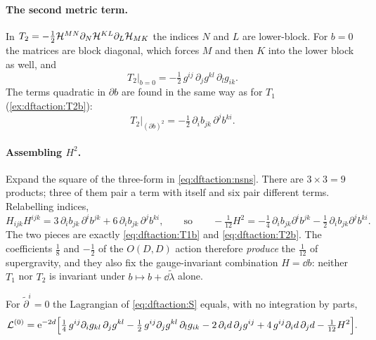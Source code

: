 \paragraph{The second metric term.} In $T_2=-\tfrac12\mathcal{H}^{MN}\partial_N\mathcal{H}^{KL}\partial_L
\mathcal{H}_{MK}$ the indices $N$ and $L$ are lower-block. For $b=0$ the matrices are block diagonal,
which forces $M$ and then $K$ into the lower block as well, and
\begin{equation}\label{eq:dftaction:T2g}
T_2\big|_{b=0}=-\tfrac12\,g^{ij}\,\partial_jg^{kl}\,\partial_lg_{ik}.
\end{equation}
The terms quadratic in $\partial b$ are found in the same way as for $T_1$ (\cref{ex:dftaction:T2b}):
\begin{equation}\label{eq:dftaction:T2b}
T_2\big|_{(\partial b)^2}=-\tfrac12\,\partial_ib_{jk}\,\partial^jb^{ki}.
\end{equation}

\paragraph{Assembling $H^2$.} Expand the square of the three-form in
\eqref{eq:dftaction:nsns}. There are $3\times3=9$ products; three of them pair a term with
itself and six pair different terms. Relabelling indices,
\begin{equation}\label{eq:dftaction:H2}
H_{ijk}H^{ijk}=3\,\partial_ib_{jk}\,\partial^ib^{jk}+6\,\partial_ib_{jk}\,\partial^jb^{ki},
\qquad\text{so}\qquad
-\tfrac1{12}H^2=-\tfrac14\,\partial_ib_{jk}\partial^ib^{jk}-\tfrac12\,\partial_ib_{jk}
\partial^jb^{ki}.
\end{equation}
The two pieces are exactly \eqref{eq:dftaction:T1b} and \eqref{eq:dftaction:T2b}. The
coefficients $\tfrac18$ and $-\tfrac12$ of the $O(D,D)$ action therefore \emph{produce} the
$\tfrac1{12}$ of supergravity, and they also fix the gauge-invariant combination $H=\dd b$:
neither $T_1$ nor $T_2$ is invariant under $b\mapsto b+\dd\tilde\lambda$ alone.

\begin{proposition}\label{prop:dftaction:L0}
For $\tilde\partial^i=0$ the Lagrangian of \eqref{eq:dftaction:S} equals, with no integration by
parts,
\begin{equation}\label{eq:dftaction:L0}
\mathcal L^{(0)}=\mathrm{e}^{-2d}\Bigl[\tfrac14\,g^{ij}\partial_ig_{kl}\,\partial_jg^{kl}
-\tfrac12\,g^{ij}\partial_jg^{kl}\,\partial_lg_{ik}-2\,\partial_id\,\partial_jg^{ij}
+4\,g^{ij}\partial_id\,\partial_jd-\tfrac1{12}H^2\Bigr].
\end{equation}
\TL {}
\end{proposition}

